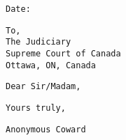 \documentclass{article}
\begin{document}
\thispagestyle{empty}
\texttt{Date:}

\vspace{0.25in}
\begin{minipage}{0.4\textwidth}
\texttt{To,}\\
\texttt{The Judiciary}\\
\texttt{Supreme Court of Canada}\\
\texttt{Ottawa, ON, Canada}
\end{minipage}

\vspace{0.25in}
\texttt{Dear Sir/Madam,}

\vfill
\texttt{Yours truly,}

\vspace{0.5in}
\texttt{Anonymous Coward}
\end{document}
